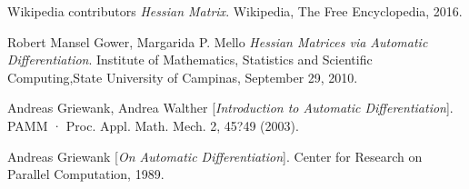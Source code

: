 \documentclass[oneside]{article}
\begin{document}
\begin{thebibliography}{9}
Wikipedia contributors
\textit{Hessian Matrix}. 
Wikipedia, The Free Encyclopedia, 2016.
 
Robert Mansel Gower, Margarida P. Mello
\textit{Hessian Matrices via Automatic Differentiation}.
Institute of Mathematics, Statistics and Scientific Computing,State University of Campinas, September 29, 2010.

 
 Andreas Griewank, Andrea Walther
[\textit{Introduction to Automatic Differentiation}]. 
PAMM · Proc. Appl. Math. Mech. 2, 45?49 (2003).

 Andreas Griewank
[\textit{On Automatic Differentiation}]. 
Center for Research on Parallel Computation, 1989.

\end{thebibliography}
\end{document}
